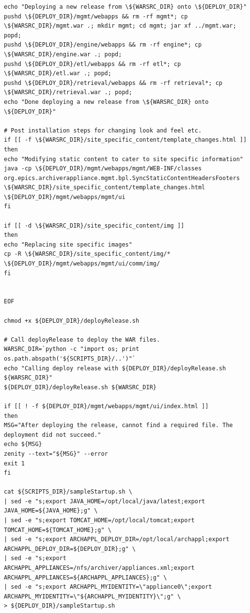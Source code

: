 \documentclass[11pt
  , a4paper
  , article
  , oneside
]{memoir}
\begin{document}
\begin{lstlisting}[style=termstyle]
echo "Deploying a new release from \${WARSRC_DIR} onto \${DEPLOY_DIR}"
pushd \${DEPLOY_DIR}/mgmt/webapps && rm -rf mgmt*; cp \${WARSRC_DIR}/mgmt.war .; mkdir mgmt; cd mgmt; jar xf ../mgmt.war; popd; 
pushd \${DEPLOY_DIR}/engine/webapps && rm -rf engine*; cp \${WARSRC_DIR}/engine.war .; popd; 
pushd \${DEPLOY_DIR}/etl/webapps && rm -rf etl*; cp \${WARSRC_DIR}/etl.war .; popd; 
pushd \${DEPLOY_DIR}/retrieval/webapps && rm -rf retrieval*; cp \${WARSRC_DIR}/retrieval.war .; popd;
echo "Done deploying a new release from \${WARSRC_DIR} onto \${DEPLOY_DIR}"

# Post installation steps for changing look and feel etc.
if [[ -f \${WARSRC_DIR}/site_specific_content/template_changes.html ]]
then
echo "Modifying static content to cater to site specific information"
java -cp \${DEPLOY_DIR}/mgmt/webapps/mgmt/WEB-INF/classes org.epics.archiverappliance.mgmt.bpl.SyncStaticContentHeadersFooters \${WARSRC_DIR}/site_specific_content/template_changes.html \${DEPLOY_DIR}/mgmt/webapps/mgmt/ui
fi

if [[ -d \${WARSRC_DIR}/site_specific_content/img ]]
then
echo "Replacing site specific images"
cp -R \${WARSRC_DIR}/site_specific_content/img/* \${DEPLOY_DIR}/mgmt/webapps/mgmt/ui/comm/img/
fi


EOF

chmod +x ${DEPLOY_DIR}/deployRelease.sh

# Call deployRelease to deploy the WAR files.
WARSRC_DIR=`python -c "import os; print os.path.abspath('${SCRIPTS_DIR}/..')"`
echo "Calling deploy release with ${DEPLOY_DIR}/deployRelease.sh ${WARSRC_DIR}"
${DEPLOY_DIR}/deployRelease.sh ${WARSRC_DIR}

if [[ ! -f ${DEPLOY_DIR}/mgmt/webapps/mgmt/ui/index.html ]]
then
MSG="After deploying the release, cannot find a required file. The deployment did not succeed."
echo ${MSG}
zenity --text="${MSG}" --error
exit 1	
fi

cat ${SCRIPTS_DIR}/sampleStartup.sh \
| sed -e "s;export JAVA_HOME=/opt/local/java/latest;export JAVA_HOME=${JAVA_HOME};g" \
| sed -e "s;export TOMCAT_HOME=/opt/local/tomcat;export TOMCAT_HOME=${TOMCAT_HOME};g" \
| sed -e "s;export ARCHAPPL_DEPLOY_DIR=/opt/local/archappl;export ARCHAPPL_DEPLOY_DIR=${DEPLOY_DIR};g" \
| sed -e "s;export ARCHAPPL_APPLIANCES=/nfs/archiver/appliances.xml;export ARCHAPPL_APPLIANCES=${ARCHAPPL_APPLIANCES};g" \
| sed -e "s;export ARCHAPPL_MYIDENTITY=\"appliance0\";export ARCHAPPL_MYIDENTITY=\"${ARCHAPPL_MYIDENTITY}\";g" \
> ${DEPLOY_DIR}/sampleStartup.sh


\end{lstlisting}
\end{document}
